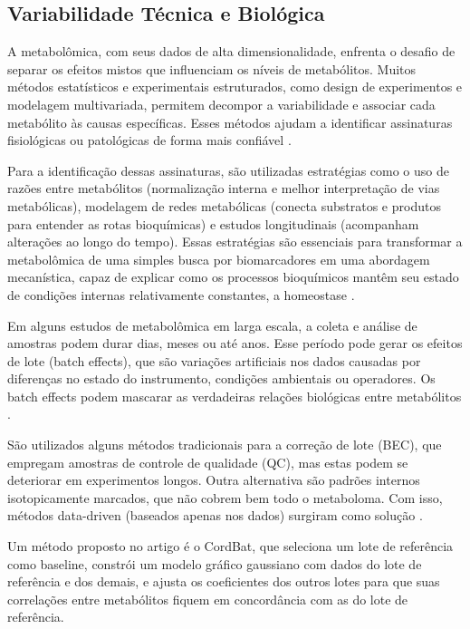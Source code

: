 \subsection{Variabilidade Técnica e Biológica}

A metabolômica, com seus dados de alta dimensionalidade, enfrenta o desafio de separar os efeitos mistos que influenciam os níveis de metabólitos. Muitos métodos estatísticos e experimentais estruturados, como design de experimentos e modelagem multivariada, permitem decompor a variabilidade e associar cada metabólito às causas específicas. Esses métodos ajudam a identificar assinaturas fisiológicas ou patológicas de forma mais confiável \cite{boccard2023we}.

Para a identificação dessas assinaturas, são utilizadas estratégias como o uso de razões entre metabólitos (normalização interna e melhor interpretação de vias metabólicas), modelagem de redes metabólicas (conecta substratos e produtos para entender as rotas bioquímicas) e estudos longitudinais (acompanham alterações ao longo do tempo). Essas estratégias são essenciais para transformar a metabolômica de uma simples busca por biomarcadores em uma abordagem mecanística, capaz de explicar como os processos bioquímicos mantêm seu estado de condições internas relativamente constantes, a homeostase \cite{boccard2023we}.

Em alguns estudos de metabolômica em larga escala, a coleta e análise de amostras podem durar dias, meses ou até anos. Esse período pode gerar os efeitos de lote (batch effects), que são variações artificiais nos dados causadas por diferenças no estado do instrumento, condições ambientais ou operadores. Os batch effects podem mascarar as verdadeiras relações biológicas entre metabólitos \cite{guo2023concordance}. 

São utilizados alguns métodos tradicionais para a correção de lote (BEC), que empregam amostras de controle de qualidade (QC), mas estas podem se deteriorar em experimentos longos. Outra alternativa são padrões internos isotopicamente marcados, que não cobrem bem todo o metaboloma. Com isso, métodos data-driven (baseados apenas nos dados) surgiram como solução \cite{guo2023concordance}.

Um método proposto no artigo \cite{guo2023concordance} é o CordBat, que seleciona um lote de referência como baseline, constrói um modelo gráfico gaussiano com dados do lote de referência e dos demais, e ajusta os coeficientes dos outros lotes para que suas correlações entre metabólitos fiquem em concordância com as do lote de referência.

